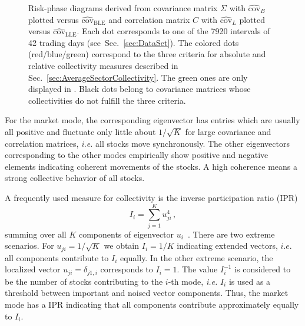 \documentclass[aps, pra, groupedaddress, showkeys, twocolumn, floatfix, 10pt]{revtex4-2}
\newcommand*\meanNONDiag[1]{\widehat{#1}}
\begin{document}
%
\begin{figure*}[!htb]
	\centering
	\begin{minipage}{0.5\textwidth}
	\end{minipage}%
	\begin{minipage}{0.5\textwidth}
	\end{minipage}
	\caption{\label{subfig:Main:RiskPhaseMean}Risk-phase diagrams derived from \protect{} covariance matrix $\Sigma$ with $\meanNONDiag{\text{cov}}_{{B}}$ plotted versus $\meanNONDiag{\text{cov}}_{\text{BLE}}$ and \protect{} correlation matrix $C$ with $\meanNONDiag{\text{cov}}_{{L}}$ plotted versus $\meanNONDiag{\text{cov}}_{\text{LLE}}$.  Each dot corresponds to one of the 7920 intervals of 42 trading days (see~Sec.~\ref{sec:DataSet}). 
		The colored dots (red/blue/green) correspond to the three criteria for absolute and relative collectivity measures described in Sec.~\ref{sec:AverageSectorCollectivity}.
		The green ones are only displayed in \protect{}.
		Black dots belong to covariance matrices whose collectivities do not fulfill the three criteria.}
\end{figure*}
%






For the market mode, the corresponding eigenvector has entries which are usually all positive and fluctuate only little about $1/\sqrt{K}$ for large covariance and correlation matrices, \textit{i.e.} all stocks move synchronously. The other eigenvectors corresponding to the other modes empirically show positive and negative elements indicating coherent movements of the stocks.
A high coherence means a strong collective behavior of all stocks.

A frequently used measure for collectivity is the inverse participation ratio (IPR)
%
\begin{equation} \label{eqn:InverseParticipationRatio}
	 I_i = \sum_{j=1}^K u_{ji}^4 \,, 
\end{equation}
%
summing over all $K$ components of eigenvector $u_i$~\cite{Plerou_2002,Plerou_1999,wang2021collective}.
There are two extreme scenarios.
For $u_{ji} = 1/\sqrt{K}$ we obtain $I_i = 1/K$ indicating extended vectors, $\textit{i.e.}$ all components contribute 
to $I_i$ equally. In the other extreme scenario, the localized vector $u_{ji} = \delta_{j1,i}$ corresponds to  $I_i =1$.
The value $I_i^{-1}$ is considered to be the number of stocks contributing to the $i$-th mode, \textit{i.e.}
$I_i$ is used as a threshold between important and noised vector components. 
Thus, the market mode has a IPR indicating that all components contribute approximately equally to $I_i$.
\end{document}
